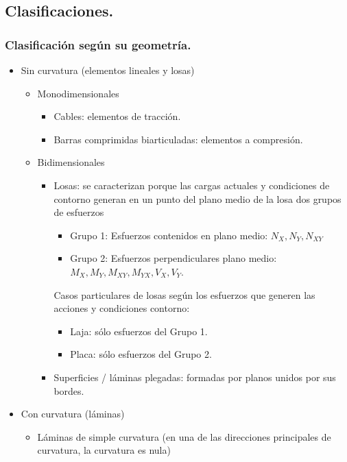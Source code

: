 \subsection{Clasificaciones.}
\subsubsection{Clasificación según su geometría.}
\begin{itemize}
    \item Sin curvatura (elementos lineales y losas)
    \begin{itemize}
        \item Monodimensionales
        \begin{itemize}
            \item Cables: elementos de tracción.
            \item Barras comprimidas biarticuladas: elementos a compresión.
        \end{itemize}
        \item Bidimensionales
        \begin{itemize}
            \item Losas: se caracterizan porque las cargas actuales y condiciones de contorno generan en un punto del plano medio de la losa dos grupos de esfuerzos
            \begin{itemize}
                \item Grupo 1: Esfuerzos contenidos en plano medio: $N_X , N_Y, N_{XY}$
                \item Grupo 2: Esfuerzos perpendiculares plano medio: $M_X, M_Y, M_{XY}, M_{YX}, V_X, V_Y$.
            \end{itemize}
            Casos particulares de losas según los esfuerzos que generen las acciones y condiciones contorno:
            \begin{itemize}
                \item Laja: sólo esfuerzos del Grupo 1.
                \item Placa: sólo esfuerzos del Grupo 2.
            \end{itemize}
            \item Superficies / láminas plegadas: formadas por planos unidos por sus bordes.
        \end{itemize}
    \end{itemize}
    \item Con curvatura (láminas)
    \begin{itemize}
        \item Láminas de simple curvatura (en una de las direcciones principales de curvatura, la curvatura es nula)

\end{itemize}
\end{itemize}
